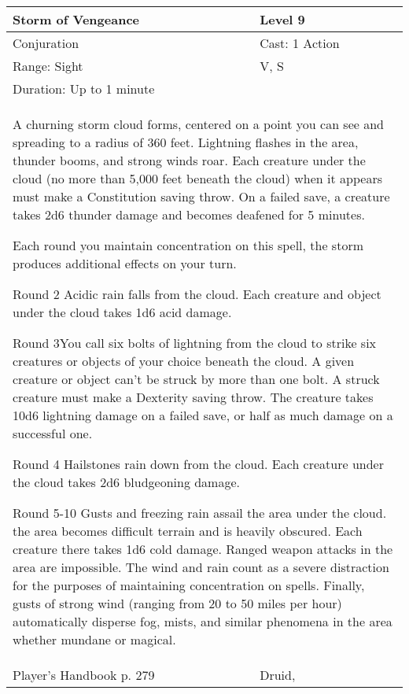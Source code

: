 \documentclass[11pt]{report}
\begin{document}
\begin{table}[H]
	\begin{tabular}{||p{6cm}|p{6cm}||}
		\hline\hline
		\bf{Storm of Vengeance} & Level 9\\ \hline
		Conjuration & Cast: 1 Action\\ \hline
		Range: Sight & V, S\\ \hline
		Duration: Up to 1 minute & \\ \hline
		\multicolumn{2}{||p{12cm}||}{A churning storm cloud forms, centered on a point you can see and spreading to a radius of 360 feet. Lightning flashes in the area, thunder booms, and strong winds roar. Each creature under the cloud (no more than 5,000 feet beneath the cloud) when it appears must make a Constitution saving throw. On a failed save, a creature takes 2d6 thunder damage and becomes deafened for 5 minutes.

Each round you maintain concentration on this spell, the storm produces additional effects on your turn.

Round 2
Acidic rain falls from the cloud. Each creature and object under the cloud takes 1d6 acid damage.

Round 3You call six bolts of lightning from the cloud to strike six creatures or objects of your choice beneath the cloud. A given creature or object can’t be struck by more than one bolt. A struck creature must make a Dexterity saving throw. The creature takes 10d6 lightning damage on a failed save, or half as much damage on a successful one.

Round 4
Hailstones rain down from the cloud. Each creature under the cloud takes 2d6 bludgeoning damage.

Round 5-10
Gusts and freezing rain assail the area under the cloud. the area becomes difficult terrain and is heavily obscured. Each creature there takes 1d6 cold damage. Ranged weapon attacks in the area are impossible. The wind and rain count as a severe distraction for the purposes of maintaining concentration on spells. Finally, gusts of strong wind (ranging from 20 to 50 miles per hour) automatically disperse fog, mists, and similar phenomena in the area whether mundane or magical.}\\ \hline
Player's Handbook p. 279 & Druid, \\ \hline\hline
	\end{tabular}
\end{table}
\end{document}
